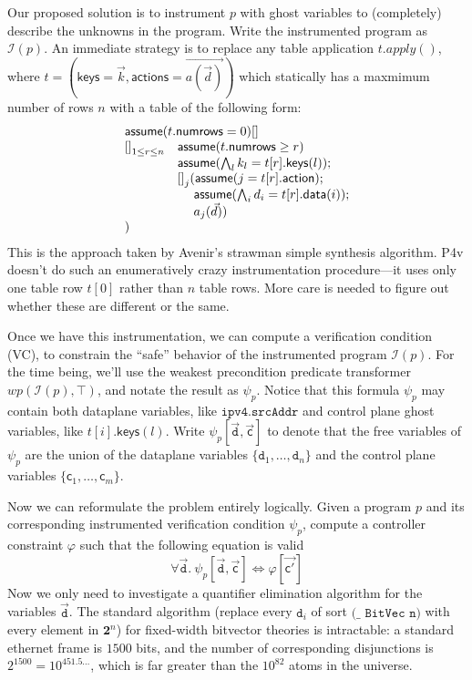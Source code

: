 \documentclass{article}
\newcommand{\MatchRow}{\mathsf{keys}}
\newcommand{\ActionRow}{\mathsf{action}}
\newcommand{\ActionDataRow}{\mathsf{data}}
\begin{document}
Our proposed solution is to instrument $p$ with ghost variables to
(completely) describe the unknowns in the program. Write the
instrumented program as $\mathcal{I}(p)$. An immediate strategy is to
replace any table application $t.\mathit{apply}()$, where
$t = (\mathsf{keys}= \vec k, \mathsf{actions} = \overrightarrow{a(\vec
  d)})$ which statically has a maxmimum number of rows $n$ with a
table of the following form:
\[
  \begin{array}{ll}
    \multicolumn{2}{l}{\mathsf{assume} (t.\mathsf{numrows} = 0) []}\\
    {[]}_{1 \leq r \leq n}
    & \mathsf{assume}(t.\mathsf{numrows} \geq r)\\
    & \mathsf{assume}(\bigwedge_l k_l = t[r].\MatchRow(l)); \\
    & {[]}_j (\mathsf{assume}(j = t[r].\ActionRow); \\
    & \quad\; \mathsf{assume}(\bigwedge_i d_i = t[r].\ActionDataRow(i)); \\
    & \quad\; a_j(\vec d)) \\
    ) 
  \end{array}
\]
This is the approach taken by Avenir's strawman simple synthesis
algorithm. P4v doesn't do such an enumeratively crazy instrumentation
procedure---it uses only one table row $t[0]$ rather than $n$ table
rows. More care is needed to figure out whether these are different or
the same.

Once we have this instrumentation, we can compute a verification
condition (VC), to constrain the ``safe'' behavior of the instrumented
program $\mathcal{I}(p)$. For the time being, we'll use the weakest
precondition predicate transformer
$\mathit{wp}(\mathcal{I}(p), \top)$, and notate the result as
$\psi_p$. Notice that this formula $\psi_p$ may contain both
dataplane variables, like $\texttt{ipv4.srcAddr}$ and control plane
ghost variables, like $t[i].\MatchRow(l)$. Write
$\psi_p[\vec{\texttt{d}},\vec{\mathsf{c}}]$ to denote that the free
variables of $\psi_p$ are the union of the dataplane variables
$\{\texttt{d}_1, \ldots,\texttt{d}_n\}$ and the control plane variables
$\{\mathsf{c}_1, \ldots, \mathsf{c}_m\}$.

Now we can reformulate the problem entirely logically. Given a program
$p$ and its corresponding instrumented verification condition
$\psi_p$, compute a controller constraint $\varphi$ such that the following equation is valid
\[\forall \vec{\texttt{d}}.~\psi_p[\vec{\texttt{d}},\vec{\mathsf{c}}] \iff \varphi[\vec{\mathsf{c'}}] \]
Now we only need to investigate a quantifier elimination algorithm for
the variables $\vec{\texttt{d}}$. The standard algorithm (replace
every $\texttt{d}_i$ of sort $\texttt{(\_~BitVec~n)}$ with every
element in $\mathbf{2}^n$) for fixed-width bitvector theories is
intractable: a standard ethernet frame is $1500$ bits, and the number
of corresponding disjunctions is $2^{1500} = 10^{451.5\ldots}$, which
is far greater than the $10^{82}$ atoms in the universe.
\end{document}
